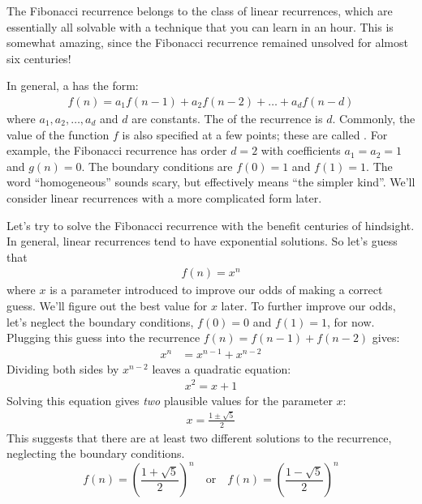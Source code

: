 The Fibonacci recurrence belongs to the class of linear recurrences,
which are essentially all solvable with a technique that you can learn
in an hour.  This is somewhat amazing, since the Fibonacci recurrence
remained unsolved for almost six centuries!

In general, a  has the form:
\begin{align*}
f(n) = a_1 f(n-1) + a_2 f(n-2) + \ldots + a_d f(n - d)
\end{align*}
where $a_1, a_2, \ldots, a_d$ and $d$ are constants. The 
of the recurrence is $d$.  Commonly, the value of the function $f$ is
also specified at a few points; these are called .  For example, the Fibonacci recurrence has order $d =
2$ with coefficients $a_1 = a_2 = 1$ and $g(n) = 0$.  The boundary
conditions are $f(0) = 1$ and $f(1) = 1$.  The word ``homogeneous''
sounds scary, but effectively means ``the simpler kind''.  We'll
consider linear recurrences with a more complicated form later.

Let's try to solve the Fibonacci recurrence with the benefit centuries
of hindsight.  In general, linear recurrences tend to have exponential
solutions.  So let's guess that
\begin{align*}
  f(n) = x^n
\end{align*}
where $x$ is a parameter introduced to improve our odds of making a
correct guess.  We'll figure out the best value for $x$ later. To
further improve our odds, let's neglect the boundary conditions, $f(0)
= 0$ and $f(1) = 1$, for now.  Plugging this guess into the recurrence
$f(n) = f(n - 1) + f(n - 2)$ gives:
\begin{align*}
x^n & = x^{n-1} + x^{n-2}
\end{align*}
Dividing both sides by $x^{n-2}$ leaves a quadratic equation:
\begin{align*}
x^2 = x + 1
\end{align*}
Solving this equation gives \emph{two} plausible values for the
parameter $x$:
\begin{align*}
x = \frac{1 \pm \sqrt{5}}{2}
\end{align*}
This suggests that there are at least two different solutions to the
recurrence, neglecting the boundary conditions.
\begin{equation*}
  f(n) = \left(\frac{1 + \sqrt{5}}{2}\right)^n\quad\text{or}\quad f(n) = \left(\frac{1 - \sqrt{5}}{2}\right)^n
\end{equation*}

